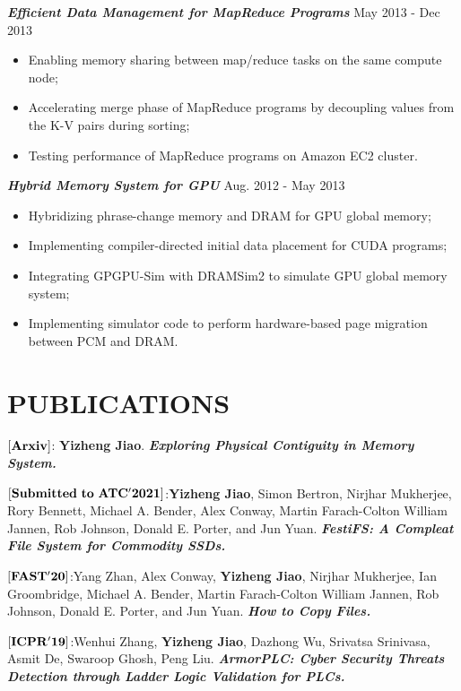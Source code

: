 \documentclass[margin, 10pt]{res} %
\begin{document}
\begin{resume}
{\sl \textbf{Efficient Data Management for MapReduce Programs}} \hfill May 2013 - Dec 2013 \\
\begin{itemize}
\item Enabling memory sharing between map/reduce tasks on the same compute node;
\item Accelerating merge phase of MapReduce programs by decoupling values from the K-V pairs during sorting;
\item Testing performance of MapReduce programs on Amazon EC2 cluster.
\end{itemize} 

{\sl \textbf{Hybrid Memory System for GPU}} \hfill Aug. 2012 - May 2013 \\
\begin{itemize}
\item Hybridizing phrase-change memory and DRAM for GPU global memory;
\item Implementing compiler-directed initial data placement for CUDA programs;
\item Integrating GPGPU-Sim with DRAMSim2 to simulate GPU global memory system;
\item Implementing simulator code to perform hardware-based page migration between PCM and DRAM.
\end{itemize} 

\section{PUBLICATIONS}
$[\bf{Arxiv}]$: \textbf{Yizheng Jiao}. \textbf{\textit{Exploring Physical Contiguity in Memory System.}}


$[\bf{Submitted\ to\ ATC'2021}]$:\textbf{Yizheng Jiao}, Simon Bertron, Nirjhar Mukherjee, Rory Bennett, Michael A. Bender, Alex Conway, Martin Farach-Colton
William Jannen, Rob Johnson, Donald E. Porter, and Jun Yuan. \textbf{\textit{FestiFS: A Compleat File System for Commodity SSDs.}}

$[\bf{FAST'20}]$:Yang Zhan, Alex Conway, \textbf{Yizheng Jiao}, Nirjhar Mukherjee, Ian Groombridge, Michael A. Bender, Martin Farach-Colton
William Jannen, Rob Johnson, Donald E. Porter, and Jun Yuan. \textbf{\textit{How to Copy Files.}}

$[\bf{ICPR'19}]$:Wenhui Zhang, \textbf{Yizheng Jiao}, Dazhong Wu, Srivatsa Srinivasa, Asmit De, Swaroop Ghosh, Peng Liu.
\textbf{\textit{ArmorPLC: Cyber Security Threats Detection through Ladder Logic Validation for PLCs.}}


\end{resume}
\end{document}
